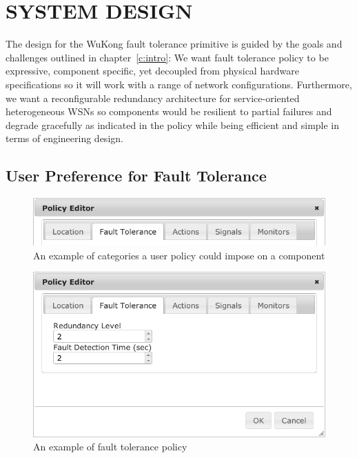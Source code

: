 \cleardoublepage
\singlespacing
\chapter{SYSTEM DESIGN}
\label{c:design}
\doublespacing\nointerlineskip

The design for the WuKong fault tolerance primitive is guided by the goals and
challenges outlined in chapter~\ref{c:intro}: We want fault tolerance
policy to be expressive, component specific, yet decoupled from physical
hardware specifications so it will work with a range of network configurations.
Furthermore, we want a reconfigurable redundancy architecture for
service-oriented heterogeneous WSNs so components would be resilient to partial
failures and degrade gracefully as indicated in the policy while being efficient
and simple in terms of engineering design.

\section{User Preference for Fault Tolerance}

\begin{figure}[h!]
\centering
    \includegraphics[width=\linewidth]{figures/fbp-policy}
\caption{An example of categories a user policy could impose on a component}
\label{fig:fbp-policy}
\end{figure}

\begin{figure}[h!]
\centering
    \includegraphics[width=\linewidth]{figures/fbp-ft-policy}
\caption{An example of fault tolerance policy}
\label{fig:fbp-ft-policy}
\end{figure}

